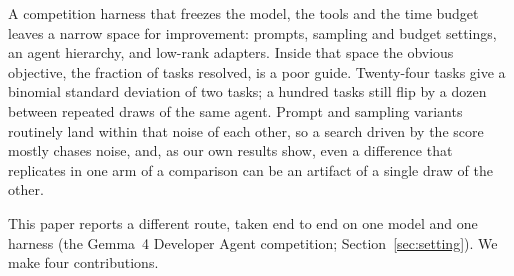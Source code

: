 \documentclass[11pt]{article}
\begin{document}
A competition harness that freezes the model, the tools and the time budget leaves a narrow space for improvement: prompts, sampling and budget settings, an agent hierarchy, and low-rank adapters. Inside that space the obvious objective, the fraction of tasks resolved, is a poor guide. Twenty-four tasks give a binomial standard deviation of two tasks; a hundred tasks still flip by a dozen between repeated draws of the same agent. Prompt and sampling variants routinely land within that noise of each other, so a search driven by the score mostly chases noise, and, as our own results show, even a difference that replicates in one arm of a comparison can be an artifact of a single draw of the other.

This paper reports a different route, taken end to end on one model and one harness (the Gemma~4 Developer Agent competition; Section~\ref{sec:setting}). We make four contributions.
\end{document}
